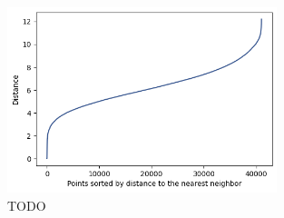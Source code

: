 \documentclass[a4paper,12pt]{report}
\begin{document}
\begin{figure}[htbp]
    \centering
    \includegraphics[width=0.7\textwidth]{images/face/dbscan-parameter-estimation-0.png}
    \caption{TODO}
    \label{fig:db0}
\end{figure}
\end{document}
